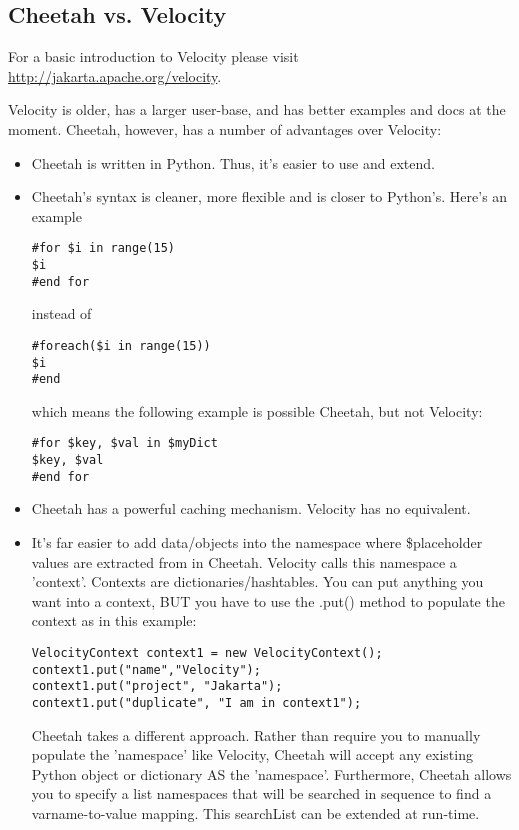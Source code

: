 \subsection{Cheetah vs. Velocity}
\label{comparisons.velocity}

For a basic introduction to Velocity please visit
\url{http://jakarta.apache.org/velocity}.


Velocity is older, has a larger user-base, and has better examples and
docs at the moment. Cheetah, however, has a number of advantages over
Velocity:
\begin{itemize}
\item Cheetah is written in Python. Thus, it's easier to use and extend.
\item Cheetah's syntax is cleaner, more flexible and is closer to Python's.
     Here's an example
\begin{verbatim}
#for $i in range(15)
$i
#end for 
\end{verbatim}
     instead of 
\begin{verbatim}
#foreach($i in range(15))  
$i
#end
\end{verbatim}
     which means the following example is possible Cheetah, but not
     Velocity:
\begin{verbatim}
#for $key, $val in $myDict
$key, $val
#end for 
\end{verbatim}


\item Cheetah has a powerful caching mechanism.  Velocity has no equivalent.
\item It's far easier to add data/objects into the namespace where \$placeholder
     values are extracted from in Cheetah.  Velocity calls this namespace a 'context'.
     Contexts are dictionaries/hashtables. You can put anything you want into a
     context, BUT you have to use the .put() method to populate the context as
     in this example:

\begin{verbatim}
VelocityContext context1 = new VelocityContext();
context1.put("name","Velocity");
context1.put("project", "Jakarta");
context1.put("duplicate", "I am in context1");
\end{verbatim}
     
     Cheetah takes a different approach. Rather than require you to manually
     populate the 'namespace' like Velocity, Cheetah will accept any existing
     Python object or dictionary AS the 'namespace'.  Furthermore, Cheetah
     allows you to specify a list namespaces that will be searched in sequence
     to find a varname-to-value mapping.  This searchList can be extended at
     run-time.
     

\end{itemize}
